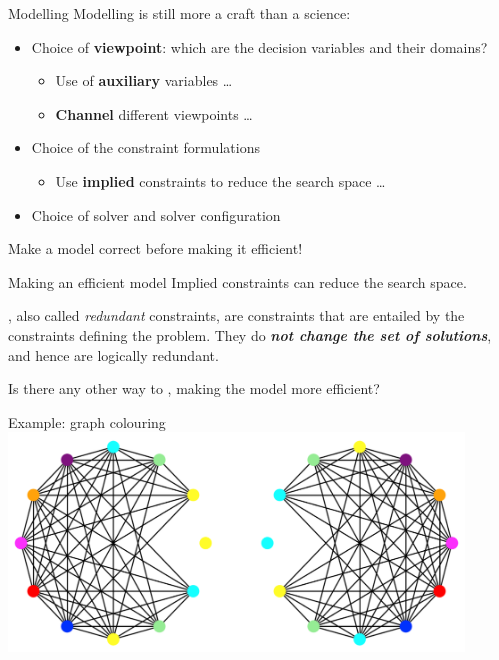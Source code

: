 \documentclass{cons-beamer}
\begin{document}
\begin{frame}{Modelling}
  Modelling is still more a craft than a science: \vfill
  \begin{itemize}
    \item Choice of \textbf{viewpoint}: which are the decision variables and their domains? 
      \begin{itemize}
        \item Use of \textbf{auxiliary} variables \dots
        \item \textbf{Channel} different viewpoints \dots
      \end{itemize} \vfill
    \item Choice of the constraint formulations 
      \begin{itemize}
        \item Use \textbf{implied} constraints to reduce the search space \dots
      \end{itemize} \vfill
    \item Choice of solver and solver configuration 
  \end{itemize}
  \vfill

  \alert{Make a model correct before making it efficient!}
\end{frame}

\begin{frame}{Making an efficient model} 
  Implied constraints can reduce the search space.

  \begin{definition}[recap]
      , also called \textit{redundant} constraints, are constraints that are entailed by the constraints defining the problem. They do \textbf{\textit{not change the set of solutions}}, and hence are logically redundant.
  \end{definition}
  \vfill 

  Is there any other way to , making the model more efficient?
\end{frame}

\begin{frame}{Example: graph colouring}
  \includegraphics[height=58mm]{images/graph_pm_symmetric} 
  \vfill 

\end{frame}
\end{document}

